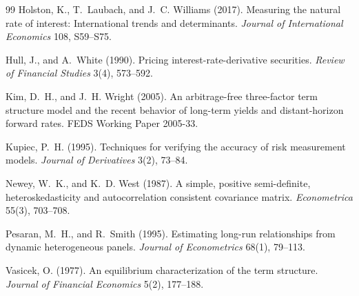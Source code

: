 \documentclass[11pt]{article}
\begin{document}
\begin{thebibliography}{99}
 Holston, K., T.~Laubach, and J.~C. Williams (2017).
Measuring the natural rate of interest: International trends and determinants.
\emph{Journal of International Economics} 108, S59--S75.

 Hull, J., and A.~White (1990).
Pricing interest-rate-derivative securities. \emph{Review of Financial Studies} 3(4),
573--592.

 Kim, D.~H., and J.~H. Wright (2005).
An arbitrage-free three-factor term structure model and the recent behavior of long-term
yields and distant-horizon forward rates. FEDS Working Paper 2005-33.

 Kupiec, P.~H. (1995). Techniques for verifying the accuracy
of risk measurement models. \emph{Journal of Derivatives} 3(2), 73--84.

 Newey, W.~K., and K.~D. West (1987).
A simple, positive semi-definite, heteroskedasticity and autocorrelation consistent
covariance matrix. \emph{Econometrica} 55(3), 703--708.

 Pesaran, M.~H., and R.~Smith (1995).
Estimating long-run relationships from dynamic heterogeneous panels.
\emph{Journal of Econometrics} 68(1), 79--113.

 Vasicek, O. (1977). An equilibrium characterization of
the term structure. \emph{Journal of Financial Economics} 5(2), 177--188.

\end{thebibliography}
\end{document}
